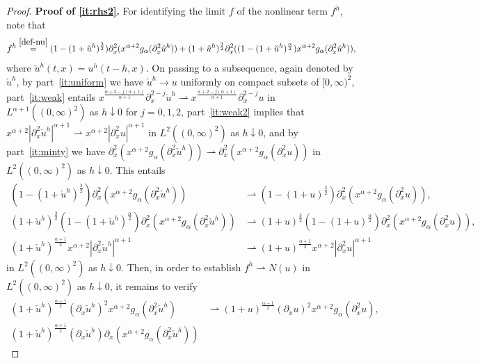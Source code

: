 \documentclass[reqno,12pt]{amsart}
\numberwithin{equation}{section}
\begin{document}
\begin{proof}
%
\textbf{Proof of \eqref{it:rhs2}. }
%
For identifying the limit $f$ of the nonlinear term $f^h$, note that
%
\[
f^h \stackrel{\eqref{def-nu}}{=} (1-(1+\check u^h)^{\frac 3 2}) \partial_x^2(x^{\alpha+2} g_\alpha(\partial_x^2 \check u^h)) + (1+\check u^h)^{\frac 3 2} \partial_x^2((1-(1+\check u^h)^{\frac \alpha 2}) x^{\alpha+2} g_\alpha(\partial_x^2 \check u^h)),
\]
%
where $\check u^h(t,x) = u^h(t-h,x)$. On passing to a subsequence, again denoted by $\check u^h$, by part~\eqref{it:uniform} we have $\check u^h \to u$ uniformly on compact subsets of $[0,\infty)^2$, part~\eqref{it:weak} entails $x^{\frac{\alpha+2-j(\alpha+1)}{\alpha+1}} \partial_x^{2-j} \check u^h \rightharpoonup x^{\frac{\alpha+2-j(\alpha+1)}{\alpha+1}} \partial_x^{2-j} u$ in $L^{\alpha+1}((0,\infty)^2)$ as $h \downarrow 0$ for $j = 0,1,2$, part~\eqref{it:weak2} implies that $x^{\alpha+2} |\partial_x^2 \check u^h|^{\alpha+1} \rightharpoonup x^{\alpha+2} |\partial_x^2 u|^{\alpha+1}$ in $L^2((0,\infty)^2)$ as $h \downarrow 0$, and by part~\eqref{it:minty} we have $\partial_x^2(x^{\alpha+2} g_\alpha(\partial_x^2 \check u^h)) \rightharpoonup \partial_x^2(x^{\alpha+2} g_\alpha(\partial_x^2 u))$ in $L^2((0,\infty)^2)$ as $h \downarrow 0$. This entails
%
\begin{align*}
(1-(1+\check u^h)^{\frac 3 2}) \partial_x^2(x^{\alpha+2} g_\alpha(\partial_x^2 \check u^h)) &\rightharpoonup (1-(1+u)^{\frac 3 2}) \partial_x^2(x^{\alpha+2} g_\alpha(\partial_x^2 u)), \\
(1+\check u^h)^{\frac 3 2} (1-(1+\check u^h)^{\frac \alpha 2}) \partial_x^2(x^{\alpha+2} g_\alpha(\partial_x^2 \check u^h)) &\rightharpoonup (1+u)^{\frac 3 2} (1-(1+u)^{\frac \alpha 2}) \partial_x^2(x^{\alpha+2} g_\alpha(\partial_x^2 u)), \\
(1+\check u^h)^{\frac{\alpha+1}{2}} x^{\alpha+2} |\partial_x^2 \check u^h|^{\alpha+1} &\rightharpoonup (1+u)^{\frac{\alpha+1}{2}} x^{\alpha+2} |\partial_x^2 u|^{\alpha+1}
\end{align*}
%
in $L^2((0,\infty)^2)$ as $h \downarrow 0$.  Then, in order to establish $f^h \rightharpoonup N(u)$ in $L^2((0,\infty)^2)$ as $h \downarrow 0$, it remains to verify
%
\begin{align*}
(1+\check u^h)^{\frac{\alpha-1}{2}}
(\partial_x \check u^h)^2 x^{\alpha+2}
g_\alpha(\partial_x^2 \check u^h)
&\rightharpoonup (1+u)^{\frac{\alpha-1}{2}}
(\partial_x u)^2 x^{\alpha+2}
g_\alpha(\partial_x^2 u), \\
(1+\check u^h)^{\frac{\alpha+1}{2}}
(\partial_x \check u^h)
\partial_x(x^{\alpha+2}
g_\alpha(\partial_x^2 \check u^h))

\end{align*}
\end{proof}
\end{document}
